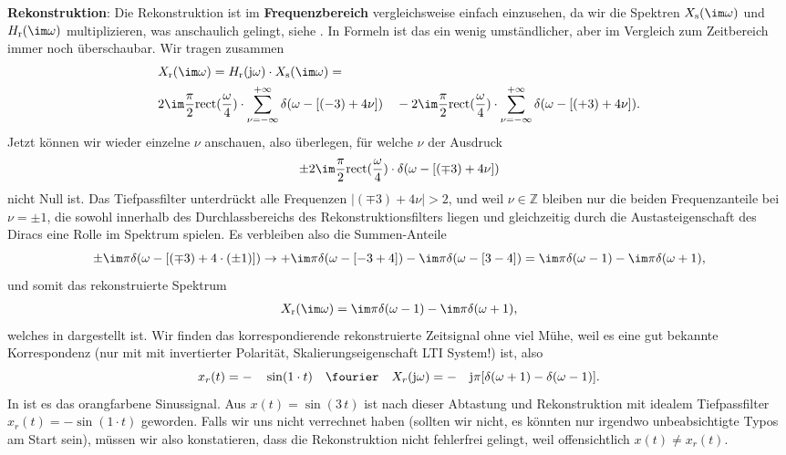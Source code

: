 \begin{Loesung}
\textbf{Rekonstruktion}:
Die Rekonstruktion ist im \textbf{Frequenzbereich} vergleichsweise einfach einzusehen,
da wir die Spektren $X_\mathrm{s}(\im\omega)$ und $H_\mathrm{r}(\im\omega)$
multiplizieren, was anschaulich gelingt, siehe
.
In Formeln ist das ein wenig umständlicher, aber im Vergleich zum Zeitbereich immer
noch überschaubar. Wir tragen zusammen
\begin{align}
&X_\mathrm{r}(\im\omega) =
H_\mathrm{r}(\mathrm{j}\omega) \cdot X_\mathrm{s}(\im\omega) =\\
&2\im
\frac{\pi}{2}\mathrm{rect}(\frac{\omega}{4}) \cdot \sum_{\nu=-\infty}^{+\infty} \delta(\omega - [(-3)+4\nu])
\quad-
2\im
\frac{\pi}{2}\mathrm{rect}(\frac{\omega}{4}) \cdot \sum_{\nu=-\infty}^{+\infty} \delta(\omega - [(+3)+4\nu]).
\end{align}
%
Jetzt können wir wieder einzelne $\nu$ anschauen, also überlegen, für welche $\nu$
der Ausdruck
\begin{equation}
\pm 2\im \frac{\pi}{2}\mathrm{rect}(\frac{\omega}{4}) \cdot \delta(\omega - [(\mp 3)+4\nu])
\end{equation}
nicht Null ist. Das Tiefpassfilter unterdrückt alle Frequenzen $|(\mp 3)+4\nu|>2$,
und weil $\nu\in\mathbb{Z}$ bleiben nur die beiden Frequenzanteile bei $\nu=\pm 1$,
die sowohl innerhalb des Durchlassbereichs des Rekonstruktionsfilters liegen
und gleichzeitig durch die Austasteigenschaft des Diracs eine Rolle im Spektrum
spielen. Es verbleiben also die Summen-Anteile
\begin{equation}
\pm \im \pi  \delta(\omega - [(\mp 3)+4 \cdot (\pm 1)]) \rightarrow
+ \im \pi  \delta(\omega - [-3+4]) - \im \pi  \delta(\omega - [3-4])=
\im \pi  \delta(\omega - 1) - \im \pi  \delta(\omega + 1),
\end{equation}
und somit das rekonstruierte Spektrum
\begin{align}
X_\mathrm{r}(\im\omega) = \im \pi  \delta(\omega - 1) - \im \pi  \delta(\omega + 1),
\end{align}
welches in  dargestellt ist.
Wir finden das korrespondierende rekonstruierte Zeitsignal ohne viel Mühe, weil
es eine gut bekannte Korrespondenz (nur mit mit invertierter Polarität, Skalierungseigenschaft LTI System!) ist, also
\begin{equation}
x_r(t) = -\quad\sin(1\cdot t) \quad\fourier\quad X_r(\mathrm{j} \omega) =
 -\quad\mathrm{j} \pi [\delta(\omega+1) - \delta(\omega-1)].
\end{equation}
In  ist es das orangfarbene Sinussignal.
Aus $x(t)=\sin(3\,t)$ ist nach dieser Abtastung und Rekonstruktion mit idealem
Tiefpassfilter $x_r(t) = -\sin(1\cdot t)$ geworden. Falls wir uns nicht verrechnet
haben (sollten wir nicht, es könnten nur irgendwo unbeabsichtigte Typos am Start sein),
müssen wir also konstatieren, dass die Rekonstruktion nicht fehlerfrei gelingt,
weil offensichtlich $x(t) \neq x_r(t)$.


\end{Loesung}
